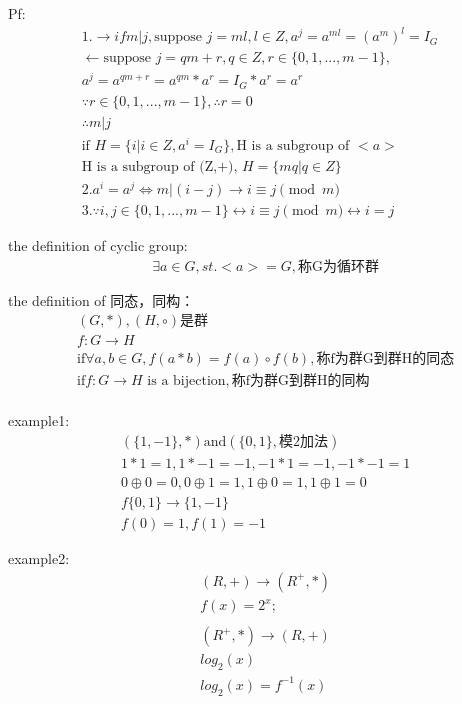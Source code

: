 \documentclass[12pt, a4paper]{article}  %
\begin{document}
Pf:
\begin{align}
    &1.\rightarrow if m|j, \text{suppose } j=ml, l\in Z,a^j=a^{ml}=(a^m)^l=I_G\\
    &\leftarrow \text{suppose } j=qm+r,q\in Z,r\in \{0,1,...,m-1\},\\
    &a^j=a^{qm+r}=a^{qm}*a^r=I_G*a^r=a^r\\
    &\because  r\in \{0,1,...,m-1\},\therefore r=0\\
    &\therefore m|j\\
    &\text{if } H=\{i|i\in Z,a^i=I_G\},\text{H is a subgroup of }<a>\\
    & \text{H  is a subgroup of (Z,+), }H=\{mq|q\in Z\}
    &\\
    &2. a^i=a^j \Leftrightarrow   m|(i-j) \rightarrow i \equiv j \pmod{m}\\
    &3.\because i,j\in \{0,1,...,m-1\}\leftrightarrow i \equiv j \pmod{m}\leftrightarrow i=j
\end{align}

the definition of cyclic group:\\
\begin{align}
    & \exists a\in G,st. <a>=G,\text{称G为循环群}
\end{align}

the definition of 同态，同构：\\
\begin{align}
    & (G,*),(H,\circ) \text{是群}\\
    & f:G\rightarrow H\\
    &\text{if} \forall a,b\in G, f(a*b)=f(a)\circ f(b),\text{称f为群G到群H的同态}\\
    & \text{if}  f:G\rightarrow H \text{ is a bijection}, \text{称f为群G到群H的同构}\\
\end{align}

example1:
\begin{align}
    &(\{1,-1\},*) \text{and}  (\{0,1\},\text{模2加法})\\
    &1*1=1,1*-1=-1,-1*1=-1,-1*-1=1\\
    &0\oplus0=0,0\oplus1=1,1\oplus 0=1,1\oplus 1=0\\
    & f\{0,1\}\rightarrow \{1,-1\}\\
    &f(0)=1,f(1)=-1
\end{align}

example2:
\begin{align}
    &(R,+) \rightarrow (R^+,*)\\
    &f(x)=2^x;\\
    &\\
    &(R^+,*) \rightarrow (R,+)\\
    &log_2(x)\\
    &log_2(x)=f^{-1}(x)
\end{align}
\end{document}
